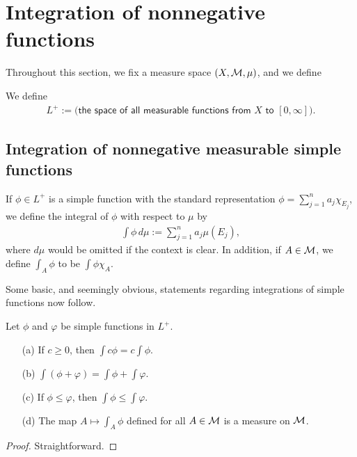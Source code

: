 \section{Integration of nonnegative functions}

Throughout this section, we fix a measure space $(X, {\mathcal{M}}, \mu)$, and we define
\begin{defi}
    We define
    \begin{align*}
        L^+:=\textsf{(the space of all measurable functions from $X$ to $[0, \infty]$)}.
    \end{align*}
\end{defi}

\subsection{Integration of nonnegative measurable simple functions}

If $\phi\in L^+$ is a simple function with the standard representation $\phi=\sum_{j=1}^n a_j\chi_{E_j}$, we define the integral of $\phi$ with respect to $\mu$ by
\begin{align*}
    \int\phi\,d\mu:=\sum_{j=1}^n a_j\mu(E_j),
\end{align*}
where $d\mu$ would be omitted if the context is clear.
In addition, if $A\in{\mathcal{M}}$, we define $\int_A\phi$ to be $\int \phi\chi_A$.

Some basic, and seemingly obvious, statements regarding integrations of simple functions now follow.
\begin{prop}
    Let $\phi$ and $\varphi$ be simple functions in $L^+$.
    \begin{enumerate}\label{properties for simple L+}
        \item[(a)]
        {
            If $c\geq 0$, then $\int c\phi=c\int\phi$.
        }
        \item[(b)]
        {
            $\int(\phi+\varphi)=\int\phi+\int\varphi$.
        }
        \item[(c)]
        {
            If $\phi\leq\varphi$, then $\int\phi\leq\int\varphi$.
        }
        \item[(d)]
        {
            The map $A\mapsto\int_A\phi$ defined for all $A\in{\mathcal{M}}$ is a measure on ${\mathcal{M}}$.
        }
    \end{enumerate}
\end{prop}
\begin{proof}
    Straightforward.
\end{proof}

